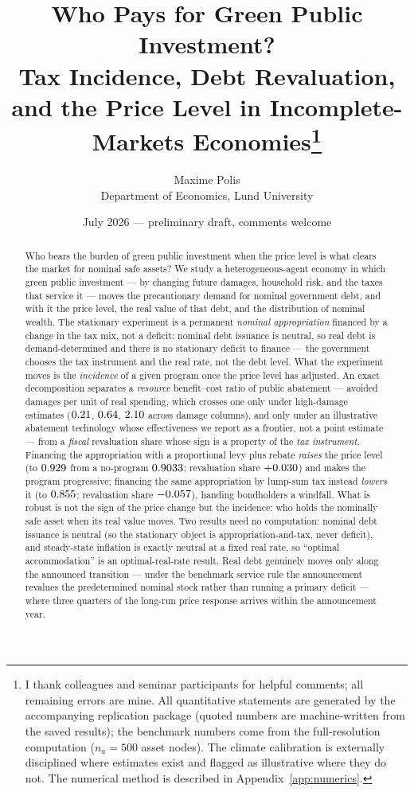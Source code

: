 \documentclass[12pt]{article}
\title{Who Pays for Green Public Investment?\\
{\large Tax Incidence, Debt Revaluation, and the Price Level
in Incomplete-Markets Economies}\thanks{%
I thank colleagues and seminar participants for helpful comments; all
remaining errors are mine. All quantitative statements are generated by the
accompanying replication package (quoted numbers are machine-written from
the saved results); the benchmark numbers come from the full-resolution
computation ($n_a=500$ asset nodes). The climate calibration is
externally disciplined where estimates exist and flagged as illustrative
where they do not. The numerical method is described in
Appendix~\ref{app:numerics}.}}
\author{Maxime Polis\\[2pt]
{\normalsize Department of Economics, Lund University}}
\date{July 2026 --- preliminary draft, comments welcome}
\begin{document}
\maketitle

\begin{abstract}
\noindent
Who bears the burden of green public investment when the price level is what
clears the market for nominal safe assets? We study a heterogeneous-agent
economy in which green public investment --- by changing future damages,
household risk, and the taxes that service it --- moves the precautionary
demand for nominal government debt, and with it the price level, the real
value of that debt, and the distribution of nominal wealth. The stationary
experiment is a permanent \emph{nominal appropriation} financed by a change
in the tax mix, not a deficit: nominal debt issuance is neutral, so real debt
is demand-determined and there is no stationary deficit to finance --- the
government chooses the tax instrument and the real rate, not the debt level.
What the experiment moves is the \emph{incidence} of a given program once the
price level has adjusted. An exact decomposition separates a \emph{resource}
benefit--cost ratio of public abatement --- avoided damages per unit of real
spending, which crosses one only under high-damage estimates
($0.21$, $0.64$, $2.10$ across damage columns), and only under an
illustrative abatement technology whose effectiveness we report as a frontier,
not a point estimate --- from a \emph{fiscal} revaluation share whose sign is
a property of the \emph{tax instrument}. Financing the appropriation with a
proportional levy plus rebate \emph{raises} the price level (to $0.929$
from a no-program $0.9033$; revaluation share $+0.030$) and makes
the program progressive; financing the same appropriation by lump-sum tax
instead \emph{lowers} it (to $0.855$; revaluation share $-0.057$),
handing bondholders a windfall. What is robust is not the sign of the price
change but the incidence: who holds the nominally safe asset when its real
value moves. Two results need no computation: nominal debt issuance is neutral
(so the stationary object is appropriation-and-tax, never deficit), and
steady-state inflation is exactly neutral at a fixed real rate, so ``optimal
accommodation'' is an optimal-real-rate result. Real debt genuinely moves only
along the announced transition --- under the benchmark service rule the
announcement revalues the predetermined nominal stock rather than running a
primary deficit --- where three quarters of the long-run price response arrives
within the announcement year.
\end{abstract}
\end{document}
